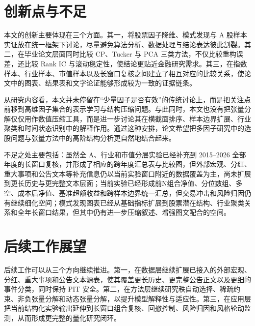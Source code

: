 \section{创新点与不足}

本文的创新主要体现在三个方面。其一，将股票因子降维、模式发现与 A 股样本实证放在统一框架下讨论，尽量避免算法分析、数据处理与结论表达彼此割裂。其二，在毕业论文层面同时比较 CP、Tucker 与 PCA 三类方法，不仅比较重构误差，还比较 Rank IC 与滚动稳定性，使结论更贴近金融研究需求。其三，在指数样本、行业样本、市值样本以及长窗口复核之间建立了相互对应的比较关系，使论文中的图表、结果表和文字论证能够形成较为一致的证据链条。

从研究内容看，本文并未停留在“少量因子是否有效”的传统讨论上，而是把关注点前移到高维因子集合的表示学习与结构压缩问题。与此同时，本文也没有把张量分解仅仅用作数值压缩工具，而是进一步讨论其在横截面排序、样本边界扩展、行业聚类和时间状态识别中的解释作用。通过这种安排，论文希望把多因子研究中的选股问题与张量方法中的高阶结构分析更自然地结合起来。

不足之处主要包括：虽然全 A、行业和市值分层实验已经补充到 2015--2026 全部年度的长窗口复核，并形成了相应的跨年度汇总表与比较图，但外部宏观、分红、重大事项和公告文本等补充信息仍以当前实验窗口附近的数据覆盖为主，尚未扩展到更长历史与更完整文本层面；当前实验已经形成前N组合净值、分位数组、多空、成本后净值、基准超额收益和跨样本边界统一汇总，但交易冲击和风险归因仍有继续细化空间；模式发现图表已经从基础指标扩展到股票潜在结构、行业聚类关系和全年长窗口结果，但其中仍有进一步压缩叙述、增强图文配合的空间。

\section{后续工作展望}

后续工作可以从三个方向继续推进。第一，在数据层继续扩展已接入的外部宏观、分红、重大事项和公告文本源表，使其覆盖更长历史、更完整公告正文以及更细的事件分类，同时保持 PIT 安全。第二，在方法层继续研究秩自动选择、稀疏约束、非负张量分解和动态张量分解，以提升模型解释性与适应性。第三，在应用层把当前结构化实验输出延伸到长窗口组合复核、回撤控制、风险归因和风格轮动监测，从而形成更完整的量化研究闭环。

